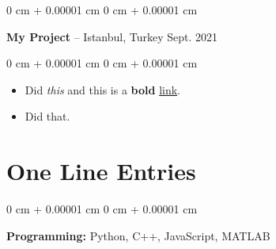 \documentclass[10pt, letterpaper]{article}
\newenvironment{highlights}{
    \begin{itemize}[
        topsep=0.10 cm,
        parsep=0.10 cm,
        partopsep=0pt,
        itemsep=0pt,
        leftmargin=0 cm + 10pt
    ]
}{
    \end{itemize}
} %
\newenvironment{onecolentry}{
    \begin{adjustwidth}{
        0 cm + 0.00001 cm
    }{
        0 cm + 0.00001 cm
    }
}{
    \end{adjustwidth}
} %
\newenvironment{twocolentry}[2][]{
    \onecolentry
    \def\secondColumn{#2}
    \setcolumnwidth{\fill, 4.5 cm}
    \begin{paracol}{2}
}{
    \switchcolumn \raggedleft \secondColumn
    \end{paracol}
    \endonecolentry
} %
\begin{document}
        \vspace{0.2 cm}

        \begin{twocolentry}{
            Sept. 2021
        }
            \textbf{My Project} -- Istanbul, Turkey\end{twocolentry}

        \vspace{0.10 cm}
        \begin{onecolentry}
            \begin{highlights}
                \item Did \textit{this} and this is a \textbf{bold} \href{https://example.com}{link}.
                \item Did that.
            \end{highlights}
        \end{onecolentry}



    
    \section{One Line Entries}

        
        \begin{onecolentry}
            \textbf{Pro\textnormal{gram}ming:} Python, C++, JavaScript, MATLAB
        \end{onecolentry}


    
\end{document}
